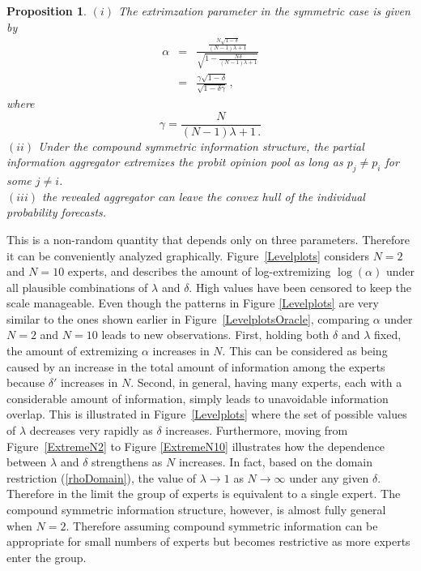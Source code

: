 \documentclass[11pt]{article}
\newtheorem{proposition}[theorem]{Proposition}
\theoremstyle{definition}
\theoremstyle{definition}
\begin{document}
\begin{proposition} \label{positiveThm}
$(i)$ The extrimzation parameter in the symmetric case is given by
\begin{eqnarray}
\alpha & = & \frac{\displaystyle{\frac{N\sqrt{1-\delta}}{(N-1)\lambda +1}}}
  {\displaystyle{\sqrt{1- \frac{N\delta}{(N-1)\lambda +1} }}} 
  \label{CompoundAlpha} \\[2ex]
& = & \frac{\gamma \sqrt{1 - \delta}}{\sqrt{1-\delta\gamma}} \nonumber \, ,
\end{eqnarray}
where 
$$\gamma = \frac{N}{(N-1)\lambda +1 \, .}$$
$(ii)$ Under the compound symmetric information structure, 
the partial information aggregator extremizes the probit opinion 
pool as long as $p_j \neq p_i$ for some $j \neq i$. \\[2ex]
$(iii)$ the revealed aggregator can leave the convex hull of the 
individual probability forecasts. 
\end{proposition}

This is a non-random quantity that depends only on three 
parameters.  Therefore it can be conveniently analyzed graphically. 
Figure~\ref{Levelplots} considers $N = 2$ and $N = 10$ experts, 
and describes the amount of log-extremizing $\log(\alpha)$ under 
all plausible combinations of $\lambda$ and $\delta$.  High values 
have been censored to keep the scale manageable.  Even though the 
patterns in Figure \ref{Levelplots} are very similar to the ones 
shown earlier in Figure~\ref{LevelplotsOracle}, comparing 
$\alpha$ under $N = 2$ and $N = 10$ leads to new observations. 
First, holding both $\delta$ and $\lambda$ fixed, the amount of 
extremizing $\alpha$ increases in $N$.  This can be considered as 
being caused by an increase in the total amount of information 
among the experts because $\delta'$ increases in $N$.  Second, 
in general, having many experts, each with a considerable amount 
of information, simply leads to unavoidable information overlap. 
This is illustrated in Figure~\ref{Levelplots} where the set of 
possible values of $\lambda$ decreases very rapidly as $\delta$ 
increases. Furthermore, moving from Figure~\ref{ExtremeN2} to 
Figure \ref{ExtremeN10} illustrates how the dependence between 
$\lambda$ and $\delta$ strengthens as $N$ increases.  In fact, 
based on the domain restriction (\ref{rhoDomain}), the value of 
$\lambda \to 1$ as $N \to \infty$ under any given $\delta$. 
Therefore in the limit the group of experts is equivalent to 
a single expert.  The compound symmetric information structure, 
however, is almost fully general when $N = 2$.  Therefore assuming 
compound symmetric information can be appropriate for small numbers 
of experts but becomes restrictive as more experts enter the group. 
\end{document}
